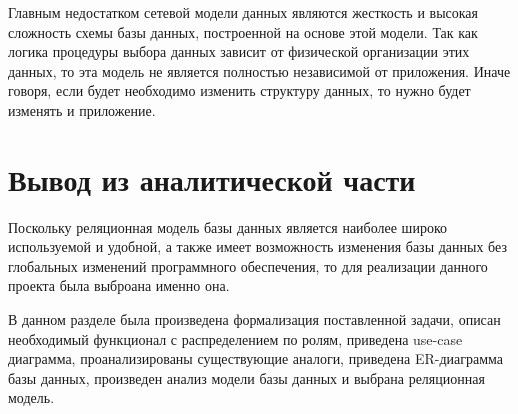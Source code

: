 Главным недостатком сетевой модели данных являются жесткость и высокая сложность схемы базы данных, построенной на основе этой модели. Так как логика процедуры выбора данных зависит от физической организации этих данных, то эта модель не является полностью независимой от приложения. Иначе говоря, если будет необходимо изменить структуру данных, то нужно будет изменять и приложение.


\section*{Вывод из аналитической части}
Поскольку реляционная модель базы данных является наиболее широко используемой и удобной, а также имеет возможность изменения базы данных без глобальных изменений программного обеспечения, то для реализации данного проекта была выброана именно она.

В данном разделе была произведена формализация поставленной задачи, описан необходимый функционал с распределением по ролям, приведена use-case диаграмма, проанализированы существующие аналоги, приведена \newline ER-диаграмма базы данных, произведен анализ модели базы данных и выбрана реляционная модель.